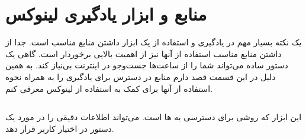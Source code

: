 \documentclass{article}
\begin{document}
\section{منابع و ابزار یادگیری لینوکس}

یک نکته بسیار مهم در یادگیری و استفاده از یک ابزار داشتن منابع مناسب است. جدا از داشتن منابع مناسب استفاده از آنها نیز از اهمیت بالایی برخوردار است. گاهی یک دستور ساده می‌تواند شما را از ساعت‌ها جست‌وجو در اینترنت بی‌نیاز کند. به همین دلیل در این قسمت قصد دارم منابع در دسترس برای یادگیری را به همراه نحوه استفاده از آنها برای کمک به استفاده از لینوکس معرفی کنم.
\subsection{}
این ابزار که روشی برای دسترسی به  ها است. می‌تواند اطلاعات دقیقی را در مورد یک دستور در اختیار کاربر قرار دهد.
\end{document}
